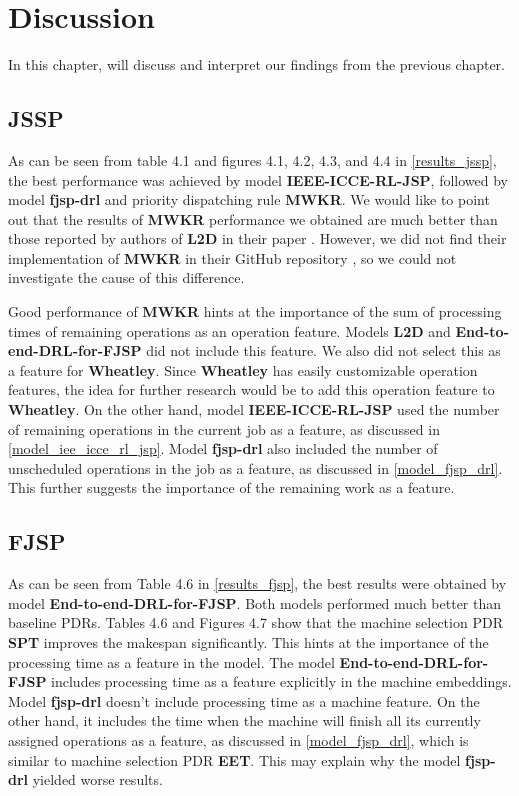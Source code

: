 \chapter{Discussion}

In this chapter, will discuss and interpret our findings from the previous chapter.

\section{JSSP} \label{discussion_jssp}
As can be seen from table 4.1 and figures 4.1, 4.2, 4.3, and 4.4 in \ref{results_jssp}, the best performance was achieved by model \textbf{IEEE-ICCE-RL-JSP}, followed by model \textbf{fjsp-drl} and priority dispatching rule \textbf{MWKR}. We would like to point out that the results of \textbf{MWKR} performance we obtained are much better than those reported by authors of \textbf{L2D} in their paper \cite{zhang2020learning}. However, we did not find their implementation of \textbf{MWKR} in their GitHub repository \cite{github_l2d}, so we could not investigate the cause of this difference.
\par
Good performance of \textbf{MWKR} hints at the importance of the sum of processing times of remaining operations as an operation feature. Models \textbf{L2D} and \textbf{End-to-end-DRL-for-FJSP} did not include this feature. We also did not select this as a feature for \textbf{Wheatley}. Since \textbf{Wheatley} has easily customizable operation features, the idea for further research would be to add this operation feature to \textbf{Wheatley}. On the other hand, model \textbf{IEEE-ICCE-RL-JSP} used the number of remaining operations in the current job as a feature, as discussed in \ref{model_iee_icce_rl_jsp}. Model \textbf{fjsp-drl} also included the number of unscheduled operations in the job as a feature, as discussed in \ref{model_fjsp_drl}. This further suggests the importance of the remaining work as a feature.

\section{FJSP}
As can be seen from Table 4.6 in \ref{results_fjsp}, the best results were obtained by model \textbf{End-to-end-DRL-for-FJSP}. Both models performed much better than baseline PDRs. Tables 4.6 and Figures 4.7 show that the machine selection PDR \textbf{SPT} improves the makespan significantly. This hints at the importance of the processing time as a feature in the model. The model \textbf{End-to-end-DRL-for-FJSP} includes processing time as a feature explicitly in the machine embeddings. Model \textbf{fjsp-drl} doesn't include processing time as a machine feature. On the other hand, it includes the time when the machine will finish all its currently assigned operations as a feature, as discussed in \ref{model_fjsp_drl}, which is similar to machine selection PDR \textbf{EET}. This may explain why the model \textbf{fjsp-drl} yielded worse results.

